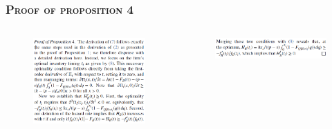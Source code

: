 \documentclass[aspectratio=169]{../presentation}
\begin{document}
    \begin{frame}
        \frametitle{\textsc{Proof of proposition 4}}

        \begin{columns}
            \begin{column}{0.5\linewidth}
                \begin{figure}[h]
                    \includegraphics[width=\linewidth]{imgs/gp01-5.png}
                \end{figure}
            \end{column}
            \begin{column}{0.5\linewidth}
                \begin{figure}[h]
                    \includegraphics[width=\linewidth]{imgs/gp01-6.png}
                \end{figure}
            \end{column}
        \end{columns}

    \end{frame}
\end{document}
